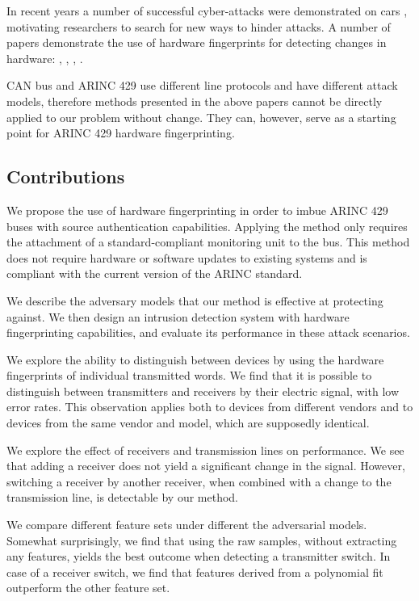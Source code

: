 \documentclass[english]{llncs}
\newcommand{\sublevel}[1]{\subsection{#1}}
\newcommand{\sublevel}[1]{\section{#1}}
\begin{document}
  In recent years a number of successful cyber-attacks were demonstrated on cars \cite{miller2015remote}, motivating researchers to search for new ways to hinder attacks. A number of papers demonstrate the use of hardware fingerprints for detecting changes in hardware: \cite{murvay2014source}, \cite{cho2017viden}, \cite{choi2018voltageids}, \cite{kneib2018scission}.
  
  CAN bus and ARINC 429 use different line protocols and have different attack models, therefore methods presented in the above papers cannot be directly applied to our problem without change. They can, however, serve as a starting point for ARINC 429 hardware fingerprinting.
  
\sublevel{Contributions}
  We propose the use of hardware fingerprinting in order to imbue ARINC 429 buses with source authentication capabilities. Applying the method only requires the attachment of a standard-compliant monitoring unit to the bus. This method does not require hardware or software updates to existing systems and is compliant with the current version of the ARINC standard.
  
  We describe the adversary models that our method is effective at protecting against. We then design an intrusion detection system with hardware fingerprinting capabilities, and evaluate its performance in these attack scenarios.
  
  We explore the ability to distinguish between devices
  by using the hardware fingerprints of individual transmitted words. We find that it is possible to distinguish between transmitters and receivers by their electric signal, with low error rates. This observation applies both to devices from different vendors and to devices from the same vendor and model, which are supposedly identical.
  
  We explore the effect of receivers and transmission lines on performance. We see that adding a receiver does not yield a significant change in the signal. However, switching a receiver by another receiver, when combined with a change to the transmission line, is detectable by our method.
  
  We compare different feature sets under different the adversarial models. Somewhat surprisingly, we find that using the raw samples, without extracting any features, yields the best outcome when detecting a transmitter switch. In case of a receiver switch, we find that features derived from a polynomial fit outperform the other feature set.
  
\end{document}
